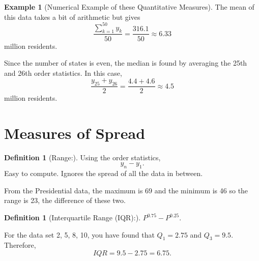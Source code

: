 \documentclass[10pt,]{book}
\theoremstyle{plain}
\theoremstyle{definition}
\newtheorem{definition}[theorem]{Definition}
\theoremstyle{definition}
\newtheorem{example}[theorem]{Example}
\numberwithin{equation}{section}
\begin{document}
\begin{example}[Numerical Example of these Quantitative Measures]
The mean of this data takes a bit of arithmetic but gives
\begin{equation*}\frac{\sum_{k=1}^{50} y_k }{50} = \frac{316.1}{50} \approx 6.33\end{equation*}
million residents.
%
\par

Since the number of states is even, the median is found by averaging the 25th and 26th order statistics. In this case, 
\begin{equation*}\frac{y_{25}+y_{26}}{2}=\frac{4.4+4.6}{2} \approx 4.5 \end{equation*} million residents.
%
\end{example}
\typeout{************************************************}
\typeout{************************************************}
\section[Measures of Spread]{Measures of Spread}\label{section-8}
\begin{definition}[Range:]\label{definition-12}
Using the order statistics, \begin{equation*}y_n - y_1.\end{equation*}  
Easy to compute. Ignores the spread of all the data in between.
%
\end{definition}
From the Presidential data, the maximum is 69 and the minimum is 46 so the range is 23, the difference of these two. %
\begin{definition}[Interquartile Range (IQR):]\label{definition-13}
\(P^{0.75} - P^{0.25}\). 
%
\end{definition}
\par

For the data set {2, 5, 8, 10}, you have found that \(Q_1 = 2.75\) and \(Q_3 = 9.5\). Therefore, \begin{equation*}IQR = 9.5 - 2.75 = 6.75.\end{equation*}
%
\par
\end{document}
